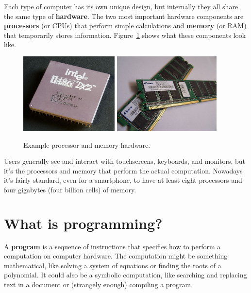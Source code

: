 Each type of computer has its own unique design, but internally they all share the same type of {\bf hardware}.
The two most important hardware components are {\bf processors} (or CPUs) that perform simple calculations and {\bf memory} (or RAM) that temporarily stores information.
Figure~\ref{fig.cpuram} shows what these components look like.

\begin{figure}[!ht]
\begin{center}
\includegraphics[height=11em]{figs/CPU.jpg}
\hspace{2em}
\includegraphics[height=11em]{figs/RAM.jpg}
\caption{Example processor and memory hardware.}
\label{fig.cpuram}
\end{center}
\end{figure}

Users generally see and interact with touchscreens, keyboards, and monitors, but it's the processors and memory that perform the actual computation.
Nowadays it's fairly standard, even for a smartphone, to have at least eight processors and four gigabytes (four billion cells) of memory.


\section{What is programming?}


A {\bf program} is a sequence of instructions that specifies how to perform a computation on computer hardware.
The computation might be something mathematical, like solving a system of equations or finding the roots of a polynomial.
It could also be a symbolic computation, like searching and replacing text in a document or (strangely enough) compiling a program.

